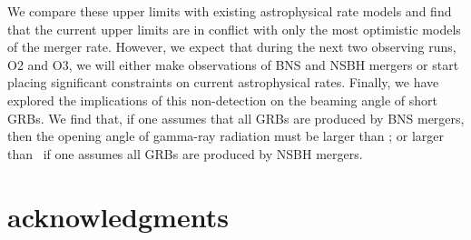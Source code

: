 \documentclass[twocolumn]{aastex6}
\begin{document}
We compare these upper limits with existing astrophysical rate models and find that the
current upper limits are in conflict with only the most optimistic models of the merger
rate. However, we expect that during the next two observing runs, O2 and O3, we will
either make observations of \ac{BNS} and \ac{NSBH} mergers or start placing significant constraints
on current astrophysical rates. Finally, we have explored the implications of this non-detection on
the beaming angle of short \acp{GRB}. We find that, if one assumes that all \acp{GRB}
are produced by \ac{BNS} mergers, then the opening angle of gamma-ray radiation must be larger
than \GRBBNSBeamingAngleConstraint; or larger than \GRBNSBHFiveBeamingAngleConstraint\ if
one assumes all \acp{GRB} are produced by \ac{NSBH} mergers.

\section*{acknowledgments}
\end{document}
